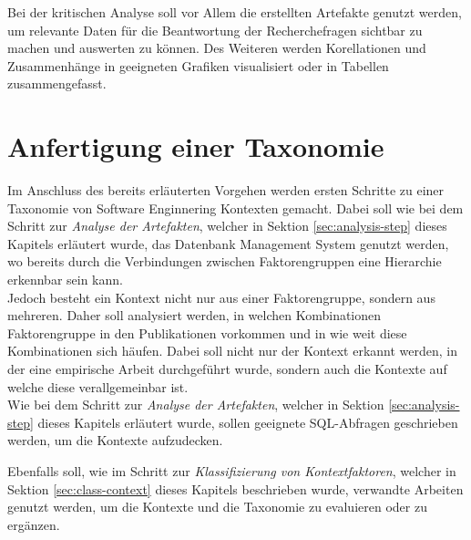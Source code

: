 Bei der kritischen Analyse soll vor Allem die erstellten Artefakte genutzt werden, um relevante Daten für die Beantwortung der Recherchefragen sichtbar zu machen und auswerten zu können. Des Weiteren werden Korellationen und Zusammenhänge in geeigneten Grafiken visualisiert oder in Tabellen zusammengefasst.




\section{Anfertigung einer Taxonomie}
Im Anschluss des bereits erläuterten Vorgehen werden ersten Schritte zu einer Taxonomie von Software Enginnering Kontexten gemacht. Dabei soll wie bei dem Schritt zur \textit{Analyse der Artefakten}, welcher in Sektion \ref{sec:analysis-step} dieses Kapitels erläutert wurde, das Datenbank Management System genutzt werden, wo bereits durch die Verbindungen zwischen Faktorengruppen eine Hierarchie erkennbar sein kann. \\

Jedoch besteht ein Kontext nicht nur aus einer Faktorengruppe, sondern aus mehreren. Daher soll analysiert werden, in welchen Kombinationen Faktorengruppe in den Publikationen vorkommen und in wie weit diese Kombinationen sich häufen. Dabei soll nicht nur der Kontext erkannt werden, in der eine empirische Arbeit durchgeführt wurde, sondern auch die Kontexte auf welche diese verallgemeinbar ist. \\
Wie bei dem Schritt zur \textit{Analyse der Artefakten}, welcher in Sektion \ref{sec:analysis-step} dieses Kapitels erläutert wurde, sollen geeignete SQL-Abfragen geschrieben werden, um die Kontexte aufzudecken.

Ebenfalls soll, wie im Schritt zur \textit{Klassifizierung von Kontextfaktoren}, welcher in Sektion \ref{sec:class-context} dieses Kapitels beschrieben wurde, verwandte Arbeiten genutzt werden, um die Kontexte und die Taxonomie zu evaluieren oder zu ergänzen.




